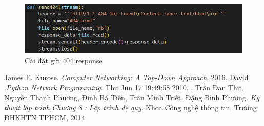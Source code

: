 \documentclass[14pt]{extreport}
\begin{document}
\begin{center}
    \begin{figure}[H]
    \begin{center}
     \includegraphics[scale=.8]{404 implement.PNG}
    \end{center}
    \caption{Cài đặt gửi 404 response}
    \end{figure}
\end{center}
\begin{thebibliography}{4}


 James F. Kurose. {\it Computer Networking: A Top-Down Approach}. 2016.
 David .{\it Python Network Programming}. Thu Jun 17 19:49:58 2010.
.
 Trần Đan Thư, Nguyễn Thanh Phương, Đinh Bá Tiến, Trần Minh Triết, Đặng Bình Phương. {\it Kỹ thuật lập trình,Chương 8 : Lập trình đệ quy}. Khoa Công nghệ thông tin, Trường ĐHKHTN TPHCM, 2014.

\end{thebibliography}
\end{document}
